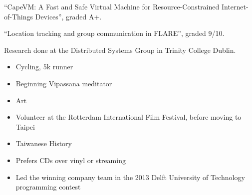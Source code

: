 “CapeVM: A Fast and Safe Virtual Machine for Resource-Constrained Internet-of-Things Devices”, graded A+.

\medskip


“Location tracking and group communication in FLARE”, graded 9/10.

\medskip

Research done at the Distributed Systems Group in Trinity College Dublin.







\begin{itemize}
\item\small{Cycling, 5k runner}
\item\small{Beginning Vipassana meditator}
\item\small{Art}
\item\small{Volunteer at the Rotterdam International Film Festival, before moving to Taipei}
\item\small{Taiwanese History}
\item\small{Prefers CDs over vinyl or streaming}
\item\small{Led the winning company team in the 2013 Delft University of Technology programming contest}
\end{itemize}






